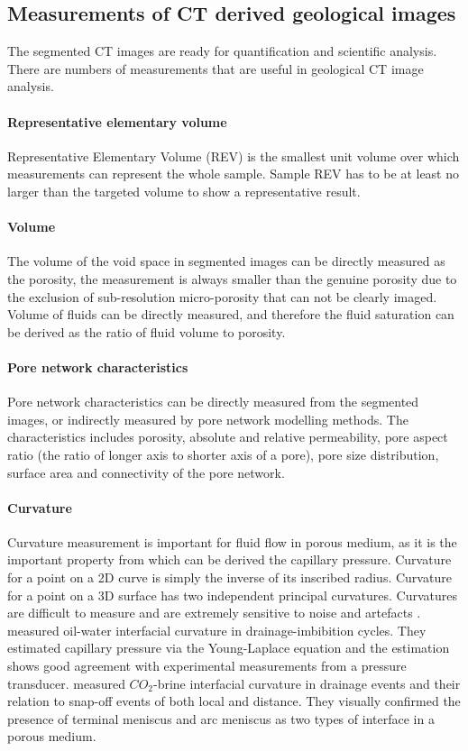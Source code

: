 \subsection{Measurements of CT derived geological images}
The segmented CT images are ready for quantification and scientific analysis. There are numbers of measurements that are useful in geological CT image analysis.

\paragraph{Representative elementary volume}
Representative Elementary Volume (REV) is the smallest unit volume over which measurements can represent the whole sample. Sample REV has to be at least no larger than the targeted volume to show a representative result. 

\paragraph{Volume}
The volume of the void space in segmented images can be directly measured as the porosity, the measurement is always smaller than the genuine porosity due to the exclusion of sub-resolution micro-porosity that can not be clearly imaged. Volume of fluids can be directly measured, and therefore the fluid saturation can be derived as the ratio of fluid volume to porosity.

\paragraph{Pore network characteristics}
Pore network characteristics can be directly measured from the segmented images, or indirectly measured by pore network modelling methods. The characteristics includes porosity, absolute and relative permeability, pore aspect ratio (the ratio of longer axis to shorter axis of a pore), pore size distribution, surface area and connectivity of the pore network.

\paragraph{Curvature}
Curvature measurement is important for fluid flow in porous medium, as it is the important property from which can be derived the capillary pressure. Curvature for a point on a 2D curve is simply the inverse of its inscribed radius. Curvature for a point on a 3D surface has two independent principal curvatures. Curvatures are difficult to measure and are extremely sensitive to noise and artefacts \citep{wildenschild2013x}. \citet{armstrong2012linking} measured oil-water interfacial curvature in drainage-imbibition cycles. They estimated capillary pressure via the Young-Laplace equation and the estimation shows good agreement with experimental measurements from a pressure transducer. \citep{andrew2015imaging} measured $CO_2$-brine interfacial curvature in drainage events and their relation to snap-off events of both local and distance. They visually confirmed the presence of terminal meniscus and arc meniscus as two types of interface in a porous medium.

